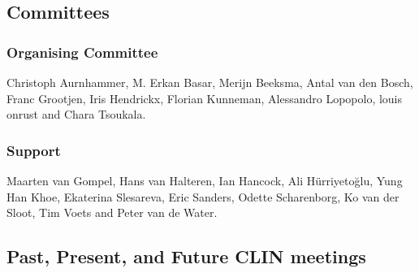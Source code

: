 \subsection*{Committees}


\subsubsection*{Organising Committee}
Christoph Aurnhammer, M. Erkan Basar, Merijn Beeksma, Antal van den Bosch, Franc Grootjen, Iris Hendrickx, Florian Kunneman, Alessandro Lopopolo, louis onrust and Chara Tsoukala.

\subsubsection*{Support}
Maarten van Gompel, Hans van Halteren, Ian Hancock, Ali Hürriyetoğlu, Yung Han Khoe, Ekaterina Slesareva, Eric Sanders, Odette Scharenborg, Ko van der Sloot, Tim Voets and Peter van de Water.


\subsection*{Past, Present, and Future CLIN meetings}
